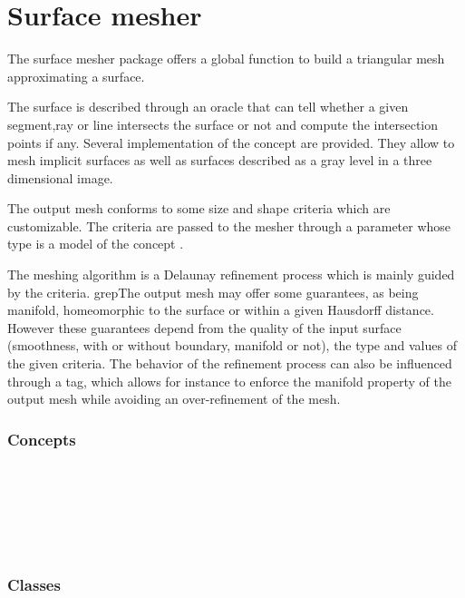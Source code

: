 \chapter{Surface mesher}


The surface mesher package offers a global function
to build a triangular mesh approximating a surface.

The surface is described through an oracle that can tell whether a
given segment,ray or line intersects the surface 
or not and  compute the
intersection  points if any. Several implementation of
the  concept are provided. They allow to mesh
implicit surfaces as well as  surfaces described as a gray level in a three
dimensional image.

The output mesh conforms to some size and shape criteria 
which are customizable. The criteria are passed to the mesher
through a parameter 
whose type is a model of the
concept .

The meshing algorithm is a Delaunay refinement process
which is mainly guided by the criteria. 
grepThe output mesh may offer some guarantees, as being manifold,
homeomorphic to the surface or within a given
Hausdorff distance.  However these guarantees depend 
from the quality of the input surface (smoothness, with or without
boundary, manifold or  not),
the type and values of the given criteria. 
The behavior of the refinement process can also be influenced through
a tag, which allows for instance to enforce the manifold property
of  the output mesh  while avoiding an over-refinement of the mesh.


\subsection*{Concepts}

\\
 \\
 \\
 \\
 \\


\subsection*{Classes}
 \\
 \\
 \\
 \\

